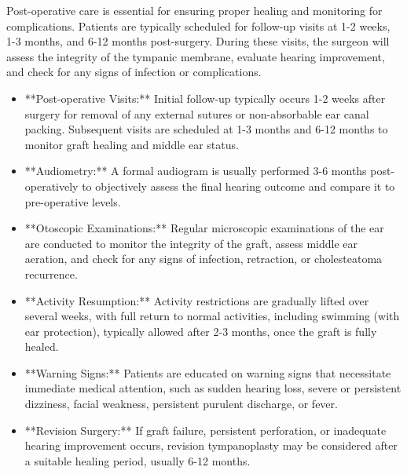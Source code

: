 Post-operative care is essential for ensuring proper healing and monitoring for complications. Patients are typically scheduled for follow-up visits at 1-2 weeks, 1-3 months, and 6-12 months post-surgery. During these visits, the surgeon will assess the integrity of the tympanic membrane, evaluate hearing improvement, and check for any signs of infection or complications.

\begin{itemize}
  \item **Post-operative Visits:** Initial follow-up typically occurs 1-2 weeks after surgery for removal of any external sutures or non-absorbable ear canal packing. Subsequent visits are scheduled at 1-3 months and 6-12 months to monitor graft healing and middle ear status.
  \item **Audiometry:** A formal audiogram is usually performed 3-6 months post-operatively to objectively assess the final hearing outcome and compare it to pre-operative levels.
  \item **Otoscopic Examinations:** Regular microscopic examinations of the ear are conducted to monitor the integrity of the graft, assess middle ear aeration, and check for any signs of infection, retraction, or cholesteatoma recurrence.
  \item **Activity Resumption:** Activity restrictions are gradually lifted over several weeks, with full return to normal activities, including swimming (with ear protection), typically allowed after 2-3 months, once the graft is fully healed.
  \item **Warning Signs:** Patients are educated on warning signs that necessitate immediate medical attention, such as sudden hearing loss, severe or persistent dizziness, facial weakness, persistent purulent discharge, or fever.
  \item **Revision Surgery:** If graft failure, persistent perforation, or inadequate hearing improvement occurs, revision tympanoplasty may be considered after a suitable healing period, usually 6-12 months.
\end{itemize}

